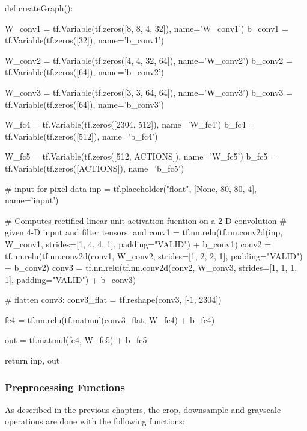 \documentclass[a4paper]{article}
\begin{document}
\begin{python}
def createGraph():

    W_conv1 = tf.Variable(tf.zeros([8, 8, 4, 32]), name='W_conv1')
    b_conv1 = tf.Variable(tf.zeros([32]), name='b_conv1')

    W_conv2 = tf.Variable(tf.zeros([4, 4, 32, 64]), name='W_conv2')
    b_conv2 = tf.Variable(tf.zeros([64]), name='b_conv2')

    W_conv3 = tf.Variable(tf.zeros([3, 3, 64, 64]), name='W_conv3')
    b_conv3 = tf.Variable(tf.zeros([64]), name='b_conv3')

    W_fc4 = tf.Variable(tf.zeros([2304, 512]), name='W_fc4')
    b_fc4 = tf.Variable(tf.zeros([512]), name='b_fc4')

    W_fc5 = tf.Variable(tf.zeros([512, ACTIONS]), name='W_fc5')
    b_fc5 = tf.Variable(tf.zeros([ACTIONS]), name='b_fc5')

    # input for pixel data
    inp = tf.placeholder("float", [None, 80, 80, 4], name='input')

    # Computes rectified linear unit activation fucntion on  a 2-D convolution
    # given 4-D input and filter tensors. and
    conv1 = tf.nn.relu(tf.nn.conv2d(inp, W_conv1, strides=[1, 4, 4, 1], padding="VALID")
                                 + b_conv1)
    conv2 = tf.nn.relu(tf.nn.conv2d(conv1, W_conv2, strides=[1, 2, 2, 1], padding="VALID")
                                 + b_conv2)
    conv3 = tf.nn.relu(tf.nn.conv2d(conv2, W_conv3, strides=[1, 1, 1, 1], padding="VALID")
                                 + b_conv3)

    # flatten conv3:
    conv3_flat = tf.reshape(conv3, [-1, 2304])

    fc4 = tf.nn.relu(tf.matmul(conv3_flat, W_fc4) + b_fc4)

    out = tf.matmul(fc4, W_fc5) + b_fc5

    return inp, out
\end{python}

\subsubsection{Preprocessing Functions}

As described in the previous chapters, the crop, downsample and grayscale operations are done with the following functions:
\end{document}
